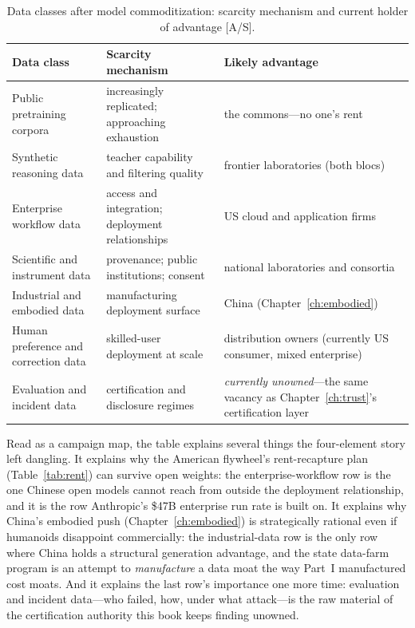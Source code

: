 \begin{table}[htbp]
  \centering
  \small
  \caption{Data classes after model commoditization: scarcity mechanism and current holder of advantage [A/S].}
  \label{tab:data-classes}
  \setlength{\tabcolsep}{4pt}
  \begin{tabular}{p{36mm}p{48mm}p{48mm}}
    \toprule
    Data class & Scarcity mechanism & Likely advantage \\
    \midrule
    Public pretraining corpora & increasingly replicated; approaching exhaustion & the commons---no one's rent \\
    \addlinespace
    Synthetic reasoning data & teacher capability and filtering quality & frontier laboratories (both blocs) \\
    \addlinespace
    Enterprise workflow data & access and integration; deployment relationships & US cloud and application firms \\
    \addlinespace
    Scientific and instrument data & provenance; public institutions; consent & national laboratories and consortia \\
    \addlinespace
    Industrial and embodied data & manufacturing deployment surface & China (Chapter~\ref{ch:embodied}) \\
    \addlinespace
    Human preference and correction data & skilled-user deployment at scale & distribution owners (currently US consumer, mixed enterprise) \\
    \addlinespace
    Evaluation and incident data & certification and disclosure regimes & \emph{currently unowned}---the same vacancy as Chapter~\ref{ch:trust}'s certification layer \\
    \bottomrule
  \end{tabular}
\end{table}

Read as a campaign map, the table explains several things the four-element story left dangling. It explains why the American flywheel's rent-recapture plan (Table~\ref{tab:rent}) can survive open weights: the enterprise-workflow row is the one Chinese open models cannot reach from outside the deployment relationship, and it is the row Anthropic's \$47B enterprise run rate is built on. It explains why China's embodied push (Chapter~\ref{ch:embodied}) is strategically rational even if humanoids disappoint commercially: the industrial-data row is the only row where China holds a structural generation advantage, and the state data-farm program is an attempt to \emph{manufacture} a data moat the way Part~I manufactured cost moats. And it explains the last row's importance one more time: evaluation and incident data---who failed, how, under what attack---is the raw material of the certification authority this book keeps finding unowned.

